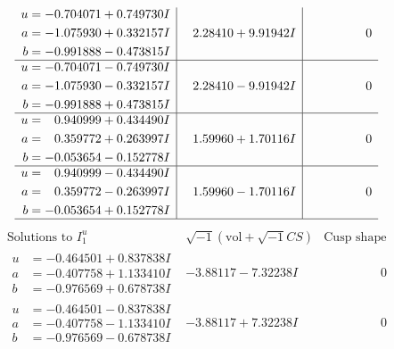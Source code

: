 \documentclass[1p]{elsarticle_modified}
\theoremstyle{definition}
\newcommand{\I}{\sqrt{-1}}
\begin{document}
$$\begin{array}{c|c|c}
\begin{aligned}
u &= -0.704071 + 0.749730 I \\
a &= -1.075930 + 0.332157 I \\
b &= -0.991888 - 0.473815 I\end{aligned}
 & \phantom{-}2.28410 + 9.91942 I & \phantom{-0.000000 } 0 \\ \hline\begin{aligned}
u &= -0.704071 - 0.749730 I \\
a &= -1.075930 - 0.332157 I \\
b &= -0.991888 + 0.473815 I\end{aligned}
 & \phantom{-}2.28410 - 9.91942 I & \phantom{-0.000000 } 0 \\ \hline\begin{aligned}
u &= \phantom{-}0.940999 + 0.434490 I \\
a &= \phantom{-}0.359772 + 0.263997 I \\
b &= -0.053654 - 0.152778 I\end{aligned}
 & \phantom{-}1.59960 + 1.70116 I & \phantom{-0.000000 } 0 \\ \hline\begin{aligned}
u &= \phantom{-}0.940999 - 0.434490 I \\
a &= \phantom{-}0.359772 - 0.263997 I \\
b &= -0.053654 + 0.152778 I\end{aligned}
 & \phantom{-}1.59960 - 1.70116 I & \phantom{-0.000000 } 0\\
 \hline 
 \end{array}$$\newpage$$\begin{array}{c|c|c}  
\text{Solutions to }I^u_{1}& \I (\text{vol} + \sqrt{-1}CS) & \text{Cusp shape}\\
 \hline 
\begin{aligned}
u &= -0.464501 + 0.837838 I \\
a &= -0.407758 + 1.133410 I \\
b &= -0.976569 + 0.678738 I\end{aligned}
 & -3.88117 - 7.32238 I & \phantom{-0.000000 } 0 \\ \hline\begin{aligned}
u &= -0.464501 - 0.837838 I \\
a &= -0.407758 - 1.133410 I \\
b &= -0.976569 - 0.678738 I\end{aligned}
 & -3.88117 + 7.32238 I & \phantom{-0.000000 } 0 \\ \hline\begin{aligned}

\end{aligned}
\end{array}$$
\end{document}
